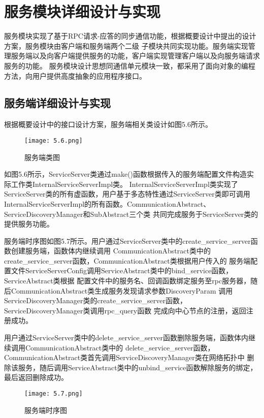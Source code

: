 \section{服务模块详细设计与实现}
服务模块实现了基于RPC请求-应答的同步通信功能，根据概要设计中提出的设计方案，服务模块由客户端和服务端两个二级
子模块共同实现功能。服务端实现管理服务端以及向客户端提供服务的功能，客户端实现管理客户端以及向服务端请求服务的功能。
服务模块设计思想同通信单元模块一致，都采用了面向对象的编程方法，向用户提供高度抽象的应用程序接口。
\subsection{服务端详细设计与实现}
根据概要设计中的接口设计方案，服务端相关类设计如图5.6所示。
\begin{figure}[htb]
  \centering
  \texttt{[image: 5.6.png]}
  \caption{服务端类图}
  \label{fig:6}
\end{figure}

如图5.6所示，ServiceServer类通过make()函数根据传入的服务端配置文件构造实际工作类InternalServiceServerImpl类。
InternalServiceServerImpl类实现了ServiceServer类的所有虚函数，用户基于多态特性通过ServiceServer类即可调用
InternalServiceServerImpl的所有函数。CommunicationAbstract、ServiceDiscoveryManager和SubAbstract三个类
共同完成服务于ServiceServer类的提供服务功能。

服务端时序图如图5.7所示。用户通过ServiceServer类中的create\_service\_server函数创建服务端，函数体内继续调用
CommunicationAbstract类中的create\_service\_server函数，CommunicationAbstract类根据用户传入的
服务端配置文件ServiceServerConfig调用ServiceAbstract类中的bind\_service函数，ServiceAbstract类根据
配置文件中的服务名、回调函数绑定服务至rpc服务器，随后CommunicationAbstract类生成服务发现请求参数DiscoveryParam
调用ServiceDiscoveryManager类的create\_service\_server函数，ServiceDiscoveryManager类调用rpc\_query函数
完成向中心节点的注册，返回注册成功。

用户通过ServiceServer类中的delete\_service\_server函数删除服务端，函数体内继续调用CommunicationAbstract类中的
delete\_service\_server函数，CommunicationAbstract类首先调用ServiceDiscoveryManager类在网络拓扑中
删除该服务，随后调用ServiceAbstract类中的unbind\_service函数解除服务的绑定，最后返回删除成功。


\begin{figure}[htb]
  \centering
  \texttt{[image: 5.7.png]}
  \caption{服务端时序图}
  \label{fig:7}
\end{figure}


